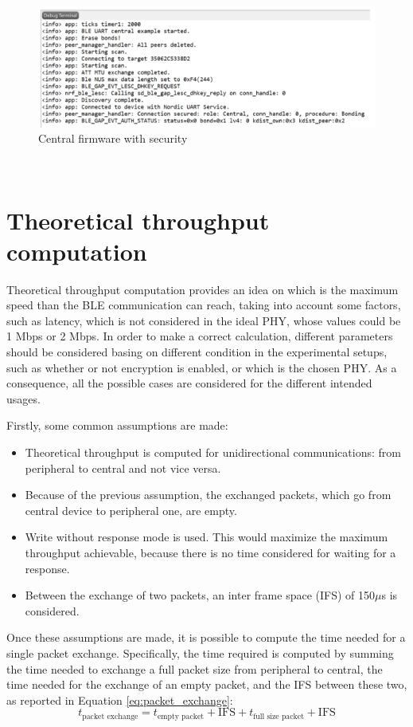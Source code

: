 \documentclass{Configuration_Files/PoliMi3i_thesis}
\begin{document}
\begin{figure}[h]
    \centering
    \includegraphics[scale=0.3]{Firmware_security/Screenshot 2024-07-22 at 22.33.43.png}
    \caption{Central firmware with security}
    \label{firm_sec_5}
\end{figure}

\\
\section{Theoretical throughput computation}

Theoretical throughput computation provides an idea on which is the maximum speed than the BLE communication can reach, taking into account some factors, such as latency, which is not considered in the ideal PHY, whose values could be 1 Mbps or 2 Mbps. In order to make a correct calculation, different parameters should be considered basing on different condition in the experimental setups, such as whether or not encryption is enabled, or which is the chosen PHY. As a consequence, all the possible cases are considered for the different intended usages.

Firstly, some common assumptions are made:
\begin{itemize}
    \item Theoretical throughput is computed for unidirectional communications: from peripheral to central and not vice versa.
    \item Because of the previous assumption, the exchanged packets, which go from central device to peripheral one, are empty.
    \item Write without response mode is used. This would maximize the maximum throughput achievable, because there is no time considered for waiting for a response.
    \item Between the exchange of two packets, an inter frame space (IFS) of 150$\mu$s is considered.
\end{itemize}

Once these assumptions are made, it is possible to compute the time needed for a single packet exchange. Specifically, the time required is computed by summing the time needed to exchange a full packet size from peripheral to central, the time needed for the exchange of an empty packet, and the IFS between these two, as reported in Equation \ref{eq:packet_exchange}:
\begin{equation}
t_{\text{packet exchange}} = t_{\text{empty packet}} + \text{IFS} + t_{\text{full size packet}} + \text{IFS}
\label{eq:packet_exchange}
\end{equation}
\end{document}

